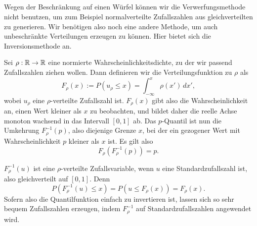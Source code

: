\subsection{}

Wegen der Beschränkung auf einen Würfel können wir die
Verwerfungsmethode nicht benutzen, um zum Beispiel normalverteilte
Zufallszahlen aus gleichverteilten zu generieren. Wir benötigen also
noch eine andere Methode, um auch unbeschränkte Verteilungen erzeugen
zu können. Hier bietet sich die Inversionsmethode an.

Sei $\rho:\mathbb{R}\to \mathbb{R}$ eine normierte Wahrscheinlichkeitsdichte, zu der
wir passend Zufallszahlen ziehen wollen. Dann definieren wir die
Verteilungsfunktion zu $\rho$ als
\begin{equation}
  F_\rho(x) := P(u_\rho \le x) = \int_{-\infty}^{x} \rho(x')\, dx',
\end{equation}
wobei $u_\rho$ eine $\rho$-verteilte Zufallszahl ist.  $F_\rho(x)$
gibt also die Wahrscheinlichkeit an, einen Wert kleiner als $x$ zu
beobachten, und bildet daher die reelle Achse monoton wachsend in das
Intervall $[0,1]$ ab. Das $p$-Quantil ist nun die Umkehrung
$F_\rho^{-1}(p)$, also diejenige Grenze $x$, bei der ein gezogener
Wert mit Wahrscheinlichkeit $p$ kleiner als $x$ ist. Es gilt also
\begin{equation}
  F_\rho\left(F_\rho^{-1}(p)\right) = p.
\end{equation}

$F_\rho^{-1}(u)$ ist eine $\rho$-verteilte Zufallsvariable, wenn $u$
eine Standardzufallszahl ist, also gleichverteilt auf $[0,1]$. Denn
\begin{equation}
  P(F_\rho^{-1}(u) \le x) = P(u \le F_\rho(x)) = F_\rho(x).
\end{equation}
Sofern also die Quantilfunktion einfach zu invertieren ist, lassen
sich so sehr bequem Zufallszahlen erzeugen, indem $F_\rho^{-1}$ auf
Standardzufallszahlen angewendet wird.

\subsubsection{}

